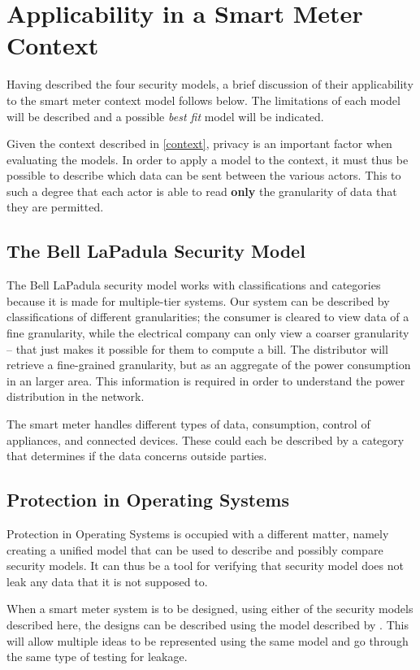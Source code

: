 \section{Applicability in a Smart Meter Context}
Having described the four security models, a brief discussion of their applicability to the smart meter context model follows below.
The limitations of each model will be described and a possible \emph{best fit} model will be indicated.

Given the context described in \cref{context}, privacy is an important factor when evaluating the models.
In order to apply a model to the context, it must thus be possible to describe which data can be sent between the various actors.
This to such a degree that each actor is able to read \textbf{only} the granularity of data that they are permitted.

\subsection{The Bell LaPadula Security Model}
The Bell LaPadula security model works with classifications and categories because it is made for multiple-tier systems.
Our system can be described by classifications of different granularities; the consumer is cleared to view data of a fine granularity, while the electrical company can only view a coarser granularity -- that just makes it possible for them to compute a bill.
The distributor will retrieve a fine-grained granularity, but as an aggregate of the power consumption in an larger area.
This information is required in order to understand the power distribution in the network.

The smart meter handles different types of data, consumption, control of appliances, and connected devices.
These could each be described by a category that determines if the data concerns outside parties.

\subsection{Protection in Operating Systems}
Protection in Operating Systems is occupied with a different matter, namely creating a unified model that can be used to describe and possibly compare security models.
It can thus be a tool for verifying that security model does not leak any data that it is not supposed to.

When a smart meter system is to be designed, using either of the security models described here, the designs can be described using the model described by \citet{HRU}.
This will allow multiple ideas to be represented using the same model and go through the same type of testing for leakage.

